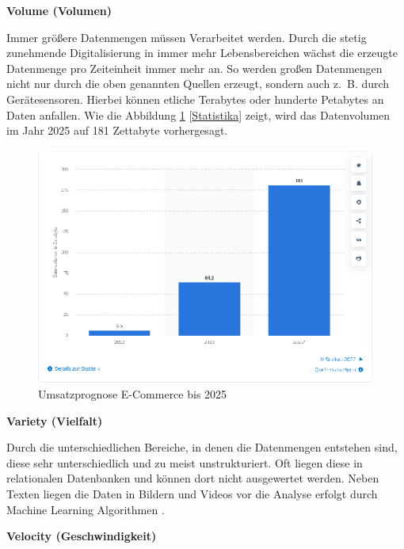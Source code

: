 \textbf{Volume (Volumen)}\vspace{0.2cm}

Immer größere Datenmengen müssen Verarbeitet werden. Durch die stetig zunehmende Digitalisierung in immer mehr Lebensbereichen wächst die erzeugte Datenmenge pro Zeiteinheit immer mehr an. So werden großen Datenmengen nicht nur durch die oben genannten Quellen erzeugt, sondern auch z. B. durch Gerätesensoren. Hierbei können etliche Terabytes oder hunderte Petabytes an Daten anfallen. Wie die Abbildung \ref{img:stat_prognose_2022} [\href{https://de.statista.com/statistik/daten/studie/267974/umfrage/prognose-zum-weltweit-generierten-datenvolumen}{Statistika}] zeigt, wird das Datenvolumen im Jahr 2025 auf 181 Zettabyte vorhergesagt.\vspace{0.2cm}

\begin{figure}[!ht]
	\centering
	\includegraphics[width=\linewidth]{images/chapter2/umsatzprognose_2025.eps}
	\caption{Umsatzprognose E-Commerce bis 2025}
	\label{img:stat_prognose_2022}
\end{figure}


\textbf{Variety (Vielfalt)}\vspace{0.2cm}

Durch die unterschiedlichen Bereiche, in denen die Datenmengen entstehen sind, diese sehr unterschiedlich und zu meist unstrukturiert. Oft liegen diese in relationalen Datenbanken und können dort nicht ausgewertet werden. Neben Texten liegen die Daten in Bildern und Videos vor die Analyse erfolgt durch Machine Learning Algorithmen .\vspace{0.5cm}

\textbf{Velocity (Geschwindigkeit)}\vspace{0.2cm}

